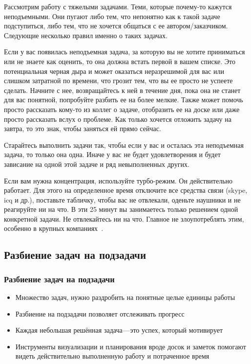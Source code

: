 \documentclass{../industrial-development}
\begin{document}
\lecturenotes

Рассмотрим работу с тяжелыми задачами. Теми, которые почему-то кажутся неподъемными. Они пугают либо тем, что непонятно как к такой задаче подступиться, либо тем, что не хочется общаться с ее автором/заказчиком. Следующие несколько правил именно о таких задачах.

Если у вас появилась неподъемная задача, за которую вы не хотите приниматься или не знаете как оценить, то она должна встать первой в вашем списке. Это потенциальная черная дыра и может оказаться неразрешимой для вас или слишком затратной по времени, что грозит тем, что вы ее просто не успеете сделать. Начните с нее, возвращайтесь к ней в течение дня, пока она не станет для вас понятной, попробуйте разбить ее на более мелкие. 
Также может помочь просто рассказать кому-то из коллег о задаче, отобразить ее на доске или даже просто рассказать вслух о проблеме.
Как только хочется отложить задачу на завтра, то это знак, чтобы заняться ей прямо сейчас.

Старайтесь выполнить задачи так, чтобы если у вас и осталась эта неподъемная задача, то только она одна. Иначе у вас не будет удовлетворения и будет зависание на одной этой задаче и ряд невыполненных других.

Если вам нужна концентрация, используйте турбо-режим. Он действительно работает. Для этого на определенное время отключите все средства связи (skype, icq и др.), поставьте табличку, чтобы вас не отвлекали, оденьте наушники и не реагируйте ни на что. В эти 25 минут вы занимаетесь только решением одной конкретной задачи. Не отвлекайтесь ни на что. Главное не злоупотреблять этим, особенно в крупных компаниях~\cite{TMHabr}.

\subsection{Разбиение задач на подзадачи}

\begin{frame} \frametitle{Разбиение задач на подзадачи}
  \begin{itemize}
  \item Множество задач, нужно раздробить на понятные целые единицы работы
  \item Разбиение на подзадачи позволяет отслеживать прогресс
  \item Каждая небольшая решённая задача — это успех, который мотивирует
  \item Инструменты визуализации и планирования вроде досок и заметок помогают видеть действительно выполненную работу и потраченное время
  \end{itemize}
\end{frame}
\end{document}

